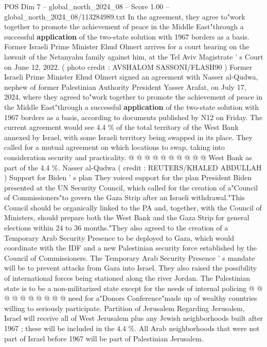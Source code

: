 \begin{textsample}{POS Dim 7 – global\_north\_2024\_08 – Score 1.00 – global\_north\_2024\_08/113284989.txt}  \label{ex:f7_pos_368}
In the agreement, they agree to"work together to promote the achievement of peace in the Middle East"through a successful \textbf{application} of the two-state solution with 1967 borders as a basis.
Former Israeli Prime Minister Ehud Olmert arrives for a court hearing on the lawsuit of the Netanyahu family against him, at the Tel Aviv Magistrate ' s Court on June 12, 2022. ( photo credit : AVSHALOM SASSONI/FLASH90 ) Former Israeli Prime Minister Ehud Olmert signed an agreement with Nasser al-Qudwa, nephew of former Palestinian Authority President Yasser Arafat, on July 17, 2024, where they agreed to"work together to promote the achievement of peace in the Middle East"through a successful \textbf{application} of the two-state solution with 1967 borders as a basis, according to documents published by N12 on Friday.
The current agreement would see 4.4 \% of the total territory of the West Bank annexed by Israel, with some Israeli territory being swapped in its place.
They called for a mutual agreement on which locations to swap, taking into consideration security and practicality. @ @ @ @ @ @ @ @ @ @ West Bank as part of the 4.4 \%.
Nasser al-Qudwa ( credit : REUTERS/KHALED ABDULLAH ) Support for Biden ' s plan They voiced support for the plan President Biden presented at the UN Security Council, which called for the creation of a"Council of Commissioners"to govern the Gaza Strip after an Israeli withdrawal."This Council should be organically linked to the PA and, together, with the Council of Ministers, should prepare both the West Bank and the Gaza Strip for general elections within 24 to 36 months."They also agreed to the creation of a Temporary Arab Security Presence to be deployed to Gaza, which would coordinate with the IDF and a new Palestinian security force established by the Council of Commissioners.
The Temporary Arab Security Presence ' s mandate will be to prevent attacks from Gaza into Israel.
They also raised the possibility of international forces being stationed along the river Jordan.
The Palestinian state is to be a non-militarized state except for the needs of internal policing @ @ @ @ @ @ @ @ @ @ need for a"Donors Conference"made up of wealthy countries willing to seriously participate.
Partition of Jerusalem Regarding Jerusalem, Israel will receive all of West Jerusalem plus any Jewish neighborhoods built after 1967 ; these will be included in the 4.4 \%.
All Arab neighborhoods that were not part of Israel before 1967 will be part of Palestinian Jerusalem.

\end{textsample}
